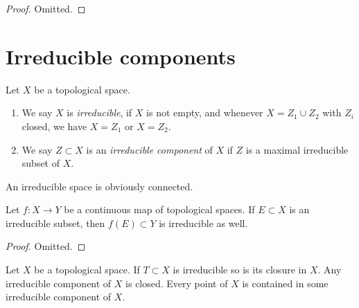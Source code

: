 \begin{proof}
Omitted.
\end{proof}




\section{Irreducible components}
\label{section-irreducible-components}

\begin{definition}
\label{definition-irreducible-components}
Let $X$ be a topological space.
\begin{enumerate}
\item We say $X$ is {\it irreducible}, if $X$ is not empty, and whenever
$X = Z_1 \cup Z_2$ with $Z_i$ closed, we have $X = Z_1$ or $X = Z_2$.
\item We say $Z \subset X$ is an {\it irreducible component} of $X$
if $Z$ is a maximal irreducible subset of $X$.
\end{enumerate}
\end{definition}

\noindent
An irreducible space is obviously connected.

\begin{lemma}
\label{lemma-image-irreducible-space}
Let $f : X \to Y$ be a continuous map of topological spaces.
If $E \subset X$ is an irreducible subset, then $f(E) \subset Y$
is irreducible as well.
\end{lemma}

\begin{proof}
Omitted.
\end{proof}

\begin{lemma}
\label{lemma-irreducible}
Let $X$ be a topological space. If $T \subset X$ is irreducible
so is its closure in $X$. Any irreducible component of $X$ is
closed. Every point of $X$ is contained in some irreducible component
of $X$.
\end{lemma}

